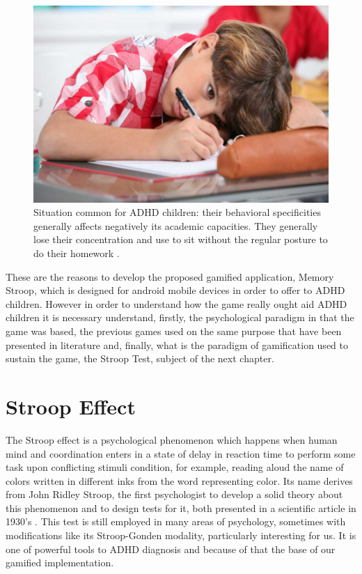 \begin{figure}[htp]
	\begin{center}
		\includegraphics[scale=0.35]{chapters/adhd/img/adhd_child.jpeg}
		\caption{Situation common for ADHD children: their behavioral specificities generally affects negatively its academic capacities. They generally lose their concentration and use to sit without the regular posture to do their homework \citep{child_example}.}
		\label{child}
	\end{center}
\end{figure}

These are the reasons to develop the proposed gamified application, Memory Stroop, which is designed for android mobile devices in order to offer to ADHD children. However in order to understand how the game really ought aid ADHD children it is necessary understand, firstly, the psychological paradigm in that the game was based, the previous games used on the same purpose that have been presented in literature and, finally, what is the paradigm of gamification used to sustain the game, the Stroop Test, subject of the next chapter. 


\section{Stroop Effect}

The Stroop effect is a psychological phenomenon which happens when human mind and coordination enters in a state of delay in reaction time to perform some task upon conflicting stimuli  condition, for example, reading aloud the name of colors written in different inks from the word representing color. Its name derives from John Ridley Stroop, the first psychologist to develop a solid theory about this phenomenon and to design tests for it, both presented in a scientific article in 1930's \citep{Studies1935}. This test is still employed in many areas of psychology, sometimes with modifications like its Stroop-Gonden modality, particularly interesting for us. It is one of powerful tools to ADHD diagnosis and because of that the base of our gamified implementation.

